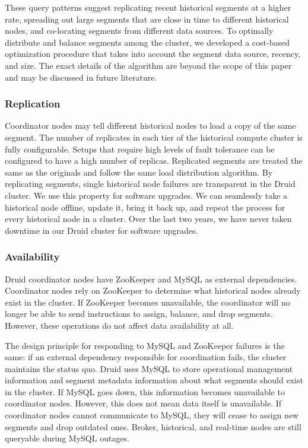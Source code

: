 \documentclass{sig-alternate-2013}
\begin{document}
These query patterns suggest replicating recent historical segments at a higher
rate, spreading out large segments that are close in time to different
historical nodes, and co-locating segments from different data sources. To
optimally distribute and balance segments among the cluster, we developed a
cost-based optimization procedure that takes into account the segment data
source, recency, and size. The exact details of the algorithm are beyond the
scope of this paper and may be discussed in future literature.

\subsubsection{Replication}
Coordinator nodes may tell different historical nodes to load a copy of the
same segment. The number of replicates in each tier of the historical compute
cluster is fully configurable. Setups that require high levels of fault
tolerance can be configured to have a high number of replicas. Replicated
segments are treated the same as the originals and follow the same load
distribution algorithm. By replicating segments, single historical node
failures are transparent in the Druid cluster. We use this property for
software upgrades. We can seamlessly take a historical node offline, update it,
bring it back up, and repeat the process for every historical node in a
cluster. Over the last two years, we have never taken downtime in our Druid
cluster for software upgrades.

\subsubsection{Availability}
Druid coordinator nodes have ZooKeeper and MySQL as external dependencies.
Coordinator nodes rely on ZooKeeper to determine what historical nodes already
exist in the cluster. If ZooKeeper becomes unavailable, the coordinator will no
longer be able to send instructions to assign, balance, and drop segments.
However, these operations do not affect data availability at all.

The design principle for responding to MySQL and ZooKeeper failures is the
same: if an external dependency responsible for coordination fails, the cluster
maintains the status quo. Druid uses MySQL to store operational management
information and segment metadata information about what segments should exist
in the cluster. If MySQL goes down, this information becomes unavailable to
coordinator nodes. However, this does not mean data itself is unavailable. If
coordinator nodes cannot communicate to MySQL, they will cease to assign new
segments and drop outdated ones. Broker, historical, and real-time nodes are still
queryable during MySQL outages.
\end{document}
